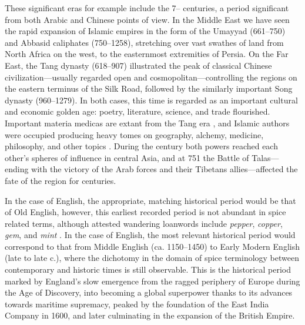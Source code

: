 These significant eras for example include the 7-- centuries, a period significant from both Arabic and Chinese points of view. In the Middle East we have seen the rapid expansion of Islamic empires in the form of the Umayyad (661--750) and Abbasid caliphates (750--1258), stretching over vast swathes of land from North Africa on the west, to the easternmost extremities of Persia. On the Far East, the Tang dynasty (618--907) illustrated the peak of classical Chinese civilization---usually regarded open and cosmopolitan---controlling the regions on the eastern terminus of the Silk Road, followed by the similarly important Song dynasty (960--1279). In both cases, this time is regarded as an important cultural and economic golden age: poetry, literature, science, and trade flourished. Important \glspl{materia medica} are extant from the Tang era \autocite{wu_illustrated_2005}, and Islamic authors were occupied producing heavy tomes on geography, alchemy, medicine, philosophy, and other topics \autocite[131]{meri_medieval_2006}. During the  century both powers reached each other's spheres of influence in central Asia, and at 751 the Battle of Talas---ending with the victory of the Arab forces and their Tibetans allies---affected the fate of the region for centuries. 

In the case of English, the appropriate, matching historical period would be that of Old English, however, this earliest recorded period is not abundant in spice related terms, although attested wandering loanwords include \textit{pepper}, \textit{copper}, \textit{gem}, and \textit{mint} \autocite{wollman_early_1993}. In the case of English, the most relevant historical period would correspond to that from Middle English (ca. 1150--1450) to Early Modern English (late  to late  c.), where the dichotomy in the domain of spice terminology between contemporary and historic times is still observable. This is the historical period marked by England's slow emergence from the ragged periphery of Europe during the Age of Discovery, into becoming a global superpower thanks to its advances towards maritime supremacy, peaked by the foundation of the East India Company in 1600, and later culminating in the expansion of the British Empire.





